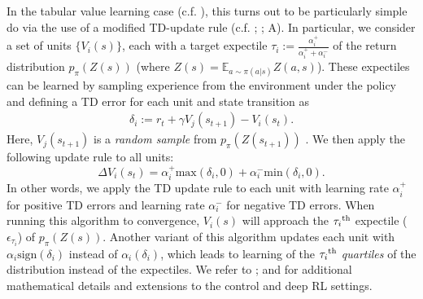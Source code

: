 In the tabular value learning case (c.f. ), this turns out to be particularly simple do via the use of a modified TD-update rule (c.f. ; \citealp{lowet2020distributional}; A).
In particular, we consider a set of units $\{ V_i(s) \}$, each with a target expectile $\tau_i := \frac{\alpha_i^+}{\alpha_i^+ + \alpha_i^-}$ of the return distribution $p_\pi(Z(s))$ (where $Z(s) = \mathbb{E}_{a \sim \pi(a|s)} Z(a, s)$).
These expectiles can be learned by sampling experience from the environment under the policy and defining a TD error for each unit and state transition as
\begin{align}
    \delta_i := r_t + \gamma V_j(s_{t+1}) - V_i(s_t).
\end{align}
Here, $V_j(s_{t+1})$ is a \emph{random sample} from  $p_\pi(Z(s_{t+1}))$ \citep{lowet2020distributional,dabney2020distributional}.
We then apply the following update rule to all units:
\begin{equation}
    \label{eq:DRL_V_expec}
    \Delta V_i(s_t) = \alpha_i^+ \text{max}(\delta_i, 0 ) + \alpha_i^- \text{min}(\delta_i, 0).
\end{equation}
In other words, we apply the TD update rule to each unit with learning rate $\alpha_i^+$ for positive TD errors and learning rate $\alpha_i^-$ for negative TD errors.
When running this algorithm to convergence, $V_i(s)$ will approach the $\tau_i\textsuperscript{th}$ expectile ($\epsilon_{\tau_i}$) of $p_\pi(Z(s))$.
Another variant of this algorithm updates each unit with $\alpha_i \text{sign}(\delta_i)$ instead of $\alpha_i (\delta_i)$, which leads to learning of the $\tau_i\textsuperscript{th}$ \emph{quartiles} of the distribution instead of the expectiles.
We refer to \citet{bellemare2017distributional,dabney2018distributional,rowland2019statistics,bellemare2023distributional}; and \citet{dabney2020distributional} for additional mathematical details and extensions to the control and deep RL settings.



